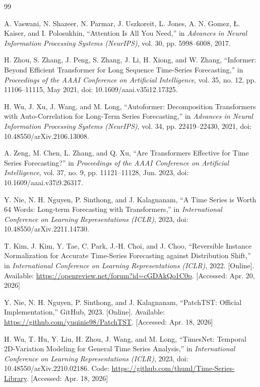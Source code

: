 \documentclass[11pt]{article}
\begin{document}
\begin{thebibliography}{99}

A. Vaswani, N. Shazeer, N. Parmar, J. Uszkoreit, L. Jones, A. N. Gomez, {\L}. Kaiser, and I. Polosukhin,
``Attention Is All You Need,''
in \textit{Advances in Neural Information Processing Systems (NeurIPS)},
vol. 30, pp. 5998--6008, 2017.

H. Zhou, S. Zhang, J. Peng, S. Zhang, J. Li, H. Xiong, and W. Zhang,
``Informer: Beyond Efficient Transformer for Long Sequence Time-Series Forecasting,''
in \textit{Proceedings of the AAAI Conference on Artificial Intelligence},
vol. 35, no. 12, pp. 11106--11115, May 2021,
doi: 10.1609/aaai.v35i12.17325.

H. Wu, J. Xu, J. Wang, and M. Long,
``Autoformer: Decomposition Transformers with Auto-Correlation for Long-Term Series Forecasting,''
in \textit{Advances in Neural Information Processing Systems (NeurIPS)},
vol. 34, pp. 22419--22430, 2021,
doi: 10.48550/arXiv.2106.13008.

A. Zeng, M. Chen, L. Zhang, and Q. Xu,
``Are Transformers Effective for Time Series Forecasting?''
in \textit{Proceedings of the AAAI Conference on Artificial Intelligence},
vol. 37, no. 9, pp. 11121--11128, Jun. 2023,
doi: 10.1609/aaai.v37i9.26317.

Y. Nie, N. H. Nguyen, P. Sinthong, and J. Kalagnanam,
``A Time Series is Worth 64 Words: Long-term Forecasting with Transformers,''
in \textit{International Conference on Learning Representations (ICLR)}, 2023,
doi: 10.48550/arXiv.2211.14730.

T. Kim, J. Kim, Y. Tae, C. Park, J.-H. Choi, and J. Choo,
``Reversible Instance Normalization for Accurate Time-Series Forecasting against Distribution Shift,''
in \textit{International Conference on Learning Representations (ICLR)}, 2022.
[Online]. Available: \url{https://openreview.net/forum?id=cGDAkQo1C0p}.
[Accessed: Apr. 20, 2026]

Y. Nie, N. H. Nguyen, P. Sinthong, and J. Kalagnanam,
``PatchTST: Official Implementation,''
GitHub, 2023.
[Online]. Available: \url{https://github.com/yuqinie98/PatchTST}.
[Accessed: Apr. 18, 2026]

H. Wu, T. Hu, Y. Liu, H. Zhou, J. Wang, and M. Long,
``TimesNet: Temporal 2D-Variation Modeling for General Time Series Analysis,''
in \textit{International Conference on Learning Representations (ICLR)}, 2023,
doi: 10.48550/arXiv.2210.02186.
Code: \url{https://github.com/thuml/Time-Series-Library}.
[Accessed: Apr. 18, 2026]


\end{thebibliography}
\end{document}
